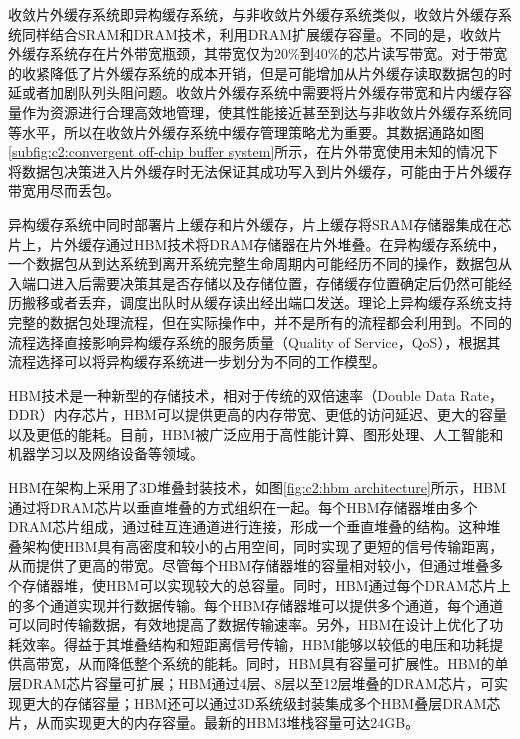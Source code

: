收敛片外缓存系统即异构缓存系统，与非收敛片外缓存系统类似，收敛片外缓存系统同样结合SRAM和DRAM技术，利用DRAM扩展缓存容量。不同的是，收敛片外缓存系统存在片外带宽瓶颈，其带宽仅为20\%到40\%的芯片读写带宽。对于带宽的收紧降低了片外缓存系统的成本开销，但是可能增加从片外缓存读取数据包的时延或者加剧队列头阻问题。收敛片外缓存系统中需要将片外缓存带宽和片内缓存容量作为资源进行合理高效地管理，使其性能接近甚至到达与非收敛片外缓存系统同等水平，所以在收敛片外缓存系统中缓存管理策略尤为重要。其数据通路如图\ref{subfig:c2:convergent off-chip buffer system}所示，在片外带宽使用未知的情况下将数据包决策进入片外缓存时无法保证其成功写入到片外缓存，可能由于片外缓存带宽用尽而丢包。



异构缓存系统中同时部署片上缓存和片外缓存，片上缓存将SRAM存储器集成在芯片上，片外缓存通过HBM技术\cite{jedecHBM2E,kim2019design}将DRAM存储器在片外堆叠。在异构缓存系统中，一个数据包从到达系统到离开系统完整生命周期内可能经历不同的操作，数据包从入端口进入后需要决策其是否存储以及存储位置，存储缓存位置确定后仍然可能经历搬移或者丢弃，调度出队时从缓存读出经出端口发送。理论上异构缓存系统支持完整的数据包处理流程，但在实际操作中，并不是所有的流程都会利用到。不同的流程选择直接影响异构缓存系统的服务质量（Quality of Service，QoS），根据其流程选择可以将异构缓存系统进一步划分为不同的工作模型。


HBM技术是一种新型的存储技术，相对于传统的双倍速率（Double Data Rate，DDR）内存芯片，HBM可以提供更高的内存带宽、更低的访问延迟、更大的容量以及更低的能耗。目前，HBM被广泛应用于高性能计算、图形处理、人工智能和机器学习以及网络设备等领域。

HBM在架构上采用了3D堆叠封装技术，如图\ref{fig:c2:hbm architecture}所示，HBM通过将DRAM芯片以垂直堆叠的方式组织在一起\cite{jedecHBM2E,kim2019design}。每个HBM存储器堆由多个DRAM芯片组成，通过硅互连通道进行连接，形成一个垂直堆叠的结构。这种堆叠架构使HBM具有高密度和较小的占用空间，同时实现了更短的信号传输距离，从而提供了更高的带宽。尽管每个HBM存储器堆的容量相对较小，但通过堆叠多个存储器堆，使HBM可以实现较大的总容量。同时，HBM通过每个DRAM芯片上的多个通道实现并行数据传输。每个HBM存储器堆可以提供多个通道，每个通道可以同时传输数据，有效地提高了数据传输速率。另外，HBM在设计上优化了功耗效率。得益于其堆叠结构和短距离信号传输，HBM能够以较低的电压和功耗提供高带宽，从而降低整个系统的能耗。同时，HBM具有容量可扩展性。HBM的单层DRAM芯片容量可扩展；HBM通过4层、8层以至12层堆叠的DRAM芯片，可实现更大的存储容量；HBM还可以通过3D系统级封装集成多个HBM叠层DRAM芯片，从而实现更大的内存容量。最新的HBM3堆栈容量可达24GB\cite{DYFZ202302005}。

